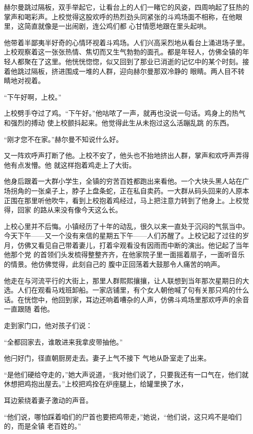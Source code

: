 \documentclass{article}
\begin{document}
赫尔曼跳过隔板，双手举起它，让看台上的人们一睹它的风姿，四周响起了狂热的掌声和喝彩声。上校觉得这股欢呼的热烈劲头同紧张的斗鸡场面不相称，在他眼里，这简直就像是一出闹剧，连公鸡们都
心甘情愿地跟在里头起哄。 

他带着半鄙夷半好奇的心情环视着斗鸡场。人们兴高采烈地从看台上涌进场子里。上校观察着这一张张热情、焦切而又生气勃勃的面孔。都是年轻人，仿佛全镇的年轻人都聚在了这里。他恍恍惚惚，似又回到了那业已消逝的记忆中的某个时刻。接着他跳过隔板，挤进围成一堆的人群，迎向赫尔曼那双冷静的
眼睛。两人目不转睛地对视着。 


“下午好啊，上校。” 

上校劈手夺过了鸡。“下午好。”他咕哝了一声，就再也没说一句话。鸡身上的热气和强烈的搏动
\newpage
使上校颤抖起来。他觉得此生从未抱过这么活蹦乱跳
的东西。 


“刚才您不在家。”赫尔曼不知说什么好。 

又一阵欢呼声打断了他。上校不安了，他头也不抬地挤出人群，掌声和欢呼声弄得他有点发懵。他
就这样抱着鸡走上了大街。 

他身后跟着一大群小学生，全镇的穷苦百姓都跑出来看他。一个大块头黑人站在广场拐角的一张桌子上，脖子上盘条蛇，正在私自卖药。一大群从码头回来的人原本正围在那里听他吹牛，看到上校抱着鸡经过，马上把注意力转到了他身上。上校觉得，回家
的路从来没有像今天这么长。 

上校心里并不后悔。小镇经历了十年的动乱，很久以来一直处于沉闷的气氛当中。今天下午——又一个没有来信的星期五下午——人们苏醒了。上校记起了过往的岁月，仿佛又看见自己带着妻儿，打着伞观看没有因雨而中断的演出。他记起了当年他那个党
\newpage
的首领们头发梳得整整齐齐，在他家院子里一面摇着扇子，一面听音乐的情景。他仿佛觉得，此刻自己的
腹中正回荡着大鼓那令人痛苦的响声。 

他走在与河流平行的大街上，那里人群熙熙攘攘，让人联想到当年那次星期日的大选。人们在观看马戏班卸船。一家店铺里，有个女人朝他喊了句有关那只鸡的什么话。在恍惚中，他回到家，耳边还响着嘈杂的人声，仿佛斗鸡场里那欢呼声的余音一直跟随
着他。 


走到家门口，他对孩子们说： 


“全都回家去，谁敢进来我拿皮带抽他。” 

他闩好门，径直朝厨房走去。妻子上气不接下
气地从卧室走了出来。 

“是他们硬给夺走的，”她大声说道，“我对他们说了，只要我还有一口气在，他们就休想把鸡抱出屋去。”上校把鸡拴在炉座腿上，给罐里换了水，
\newpage

耳边萦绕着妻子激动的声音。 

“他们说，哪怕踩着咱们的尸首也要把鸡带走，”她说，“他们说，这只鸡不是咱们的，而是全镇
老百姓的。” 
\end{document}
